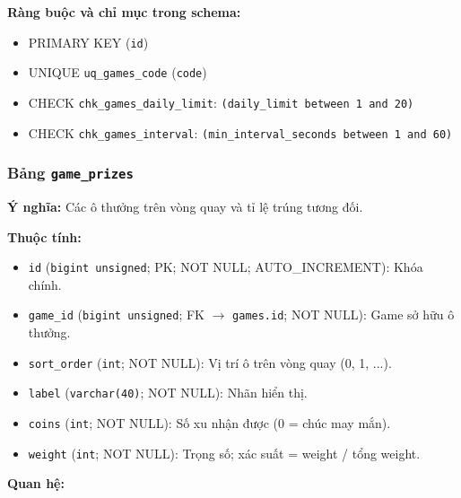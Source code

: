\textbf{Ràng buộc và chỉ mục trong schema:}

\begin{itemize}

\item PRIMARY KEY (\texttt{id})

\item UNIQUE \texttt{uq\_games\_code} (\texttt{code})

\item CHECK \texttt{chk\_games\_daily\_limit}: \texttt{(daily\_limit between 1 and 20)}

\item CHECK \texttt{chk\_games\_interval}: \texttt{(min\_interval\_seconds between 1 and 60)}

\end{itemize}

\subsubsection{Bảng \texttt{game\_prizes}}

\textbf{Ý nghĩa:} Các ô thưởng trên vòng quay và tỉ lệ trúng tương đối.\par

\textbf{Thuộc tính:}

\begin{itemize}

\item \texttt{id} (\texttt{bigint unsigned}; PK; NOT NULL; AUTO_INCREMENT): Khóa chính.

\item \texttt{game\_id} (\texttt{bigint unsigned}; FK $\rightarrow$ \texttt{games.id}; NOT NULL): Game sở hữu ô thưởng.

\item \texttt{sort\_order} (\texttt{int}; NOT NULL): Vị trí ô trên vòng quay (0, 1, ...).

\item \texttt{label} (\texttt{varchar(40)}; NOT NULL): Nhãn hiển thị.

\item \texttt{coins} (\texttt{int}; NOT NULL): Số xu nhận được (0 = chúc may mắn).

\item \texttt{weight} (\texttt{int}; NOT NULL): Trọng số; xác suất = weight / tổng weight.

\end{itemize}

\textbf{Quan hệ:}

